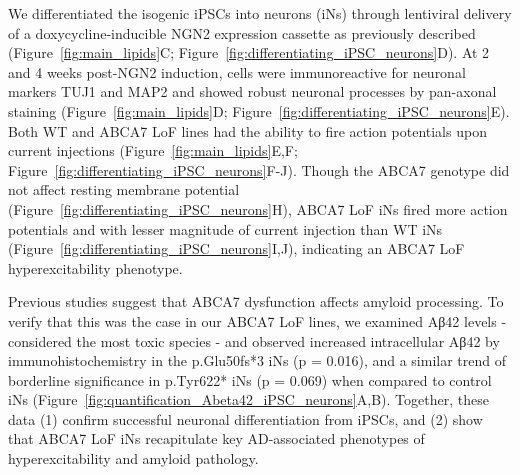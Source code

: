 We differentiated the isogenic iPSCs into neurons (iNs) through lentiviral delivery of a doxycycline-inducible NGN2 expression cassette as previously described\cite{Ho2016-kz} (Figure~\ref{fig:main_lipids}C; Figure~\ref{fig:differentiating_iPSC_neurons}D). At 2 and 4 weeks post-NGN2 induction, cells were immunoreactive for neuronal markers TUJ1 and MAP2 and showed robust neuronal processes by pan-axonal staining (Figure~\ref{fig:main_lipids}D; Figure~\ref{fig:differentiating_iPSC_neurons}E). Both WT and ABCA7 LoF lines had the ability to fire action potentials upon current injections (Figure~\ref{fig:main_lipids}E,F; Figure~\ref{fig:differentiating_iPSC_neurons}F-J). Though the ABCA7 genotype did not affect resting membrane potential (Figure~\ref{fig:differentiating_iPSC_neurons}H), ABCA7 LoF iNs fired more action potentials and with lesser magnitude of current injection than WT iNs (Figure~\ref{fig:differentiating_iPSC_neurons}I,J), indicating an ABCA7 LoF hyperexcitability phenotype. 

Previous studies suggest that ABCA7 dysfunction affects amyloid processing\cite{Satoh2015-yu,Sakae2016-uy,Bamji-Mirza2018-xt,Chan2008-qu,De_Roeck2018-zx}. To verify that this was the case in our ABCA7 LoF lines, we examined Aβ42 levels - considered the most toxic species\cite{Pauwels2012-ul,Fraser1991-tj,Pike1993-xs,Pettegrew2001-sm,Phillips2019-ev} - and observed  increased intracellular Aβ42 by immunohistochemistry in the p.Glu50fs*3 iNs (p = 0.016), and a similar trend of borderline significance in p.Tyr622* iNs (p = 0.069) when compared to control iNs (Figure~\ref{fig:quantification_Abeta42_iPSC_neurons}A,B). Together, these data (1) confirm successful neuronal differentiation from iPSCs, and (2) show that ABCA7 LoF iNs recapitulate key AD-associated phenotypes of hyperexcitability and amyloid pathology.

